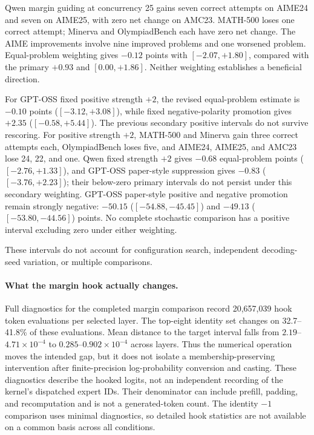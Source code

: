 



Qwen margin guiding at concurrency 25 gains seven correct attempts on
AIME24 and seven on AIME25, with zero net change on AMC23. MATH-500
loses one correct attempt; Minerva and OlympiadBench each have zero net
change. The AIME improvements involve nine improved problems and one
worsened problem. Equal-problem weighting gives $-0.12$ points with
$[-2.07,+1.80]$, compared with the primary $+0.93$ and $[0.00,+1.86]$.
Neither weighting establishes a beneficial direction.

For GPT-OSS fixed positive strength $+2$, the revised equal-problem
estimate is $-0.10$ points ($[-3.12,+3.08]$), while fixed negative-polarity
promotion gives $+2.35$ ($[-0.58,+5.44]$). The previous secondary
positive intervals do not survive rescoring. For positive strength $+2$,
MATH-500 and Minerva gain three correct attempts each, OlympiadBench
loses five, and AIME24, AIME25, and AMC23 lose 24, 22, and one.
Qwen fixed strength $+2$ gives $-0.68$ equal-problem points
($[-2.76,+1.33]$), and GPT-OSS paper-style suppression gives $-0.83$
($[-3.76,+2.23]$); their below-zero primary intervals do not persist
under this secondary weighting. GPT-OSS paper-style positive and negative
promotion remain strongly negative: $-50.15$ ($[-54.88,-45.45]$) and
$-49.13$ ($[-53.80,-44.56]$) points. No complete stochastic comparison
has a positive interval excluding zero under either weighting.

These intervals do not account for configuration search, independent decoding-seed
variation, or multiple comparisons.

\paragraph{What the margin hook actually changes.}
Full diagnostics for the completed margin comparison record 20,657,039
hook token evaluations per selected layer. The top-eight identity set changes
on 32.7--41.8\% of these evaluations. Mean distance to the target interval
falls from $2.19$--$4.71\times10^{-4}$ to
$0.285$--$0.902\times10^{-4}$ across layers. Thus the numerical operation
moves the intended gap, but it does not isolate a membership-preserving
intervention after finite-precision log-probability conversion and casting.
These diagnostics describe the hooked logits, not an independent recording
of the kernel's dispatched expert IDs. Their denominator can include
prefill, padding, and recomputation and is not a generated-token count.
The identity $-1$ comparison uses minimal diagnostics, so detailed hook
statistics are not available on a common basis across all conditions.


